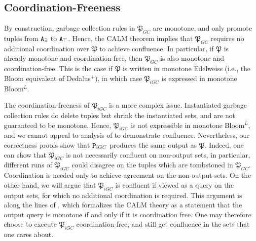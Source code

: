 \subsection{Coordination-Freeness}
By construction, garbage collection rules in $\mathfrak{P}_{GC}$ are monotone, and only promote tuples from $\tt{A}_\exists$ to $\tt{A}_\top$.
Hence, the CALM theorem implies that $\mathfrak{P}_{GC}$ requires no additional coordination over $\mathfrak{P}$ to achieve confluence.
In particular, if $\mathfrak{P}$ is already monotone and coordination-free, then $\mathfrak{P}_{GC}$ is also monotone and coordination-free.
This is the case if $\mathfrak{P}$ is written in monotone Edelweiss (i.e., the Bloom equivalent of Dedalus$^+$), in which case $\mathfrak{P}_{iGC}$ is expressed in monotone Bloom$^L$.

The coordination-freeness of $\mathfrak{P}_{iGC}$ is a more complex issue.
Instantiated garbage collection rules do delete tuples but shrink the instantiated sets, and are not guaranteed to be monotone.
Hence, $\mathfrak{P}_{iGC}$ is not expressible in monotone Bloom$^L$, and we cannot appeal to analysis of \cite{marczak2012confluence} to demonstrate confluence.
Nevertheless, our correctness proofs show that $\tt{P}_{iGC}$ produces the same output as $\mathfrak{P}$.
Indeed, one can show that $\mathfrak{P}_{iGC}$ is not necessarily confluent on non-output sets, in particular, different runs of $\mathfrak{P}_{iGC}$ could disagree on the tuples which are tombstoned in $\mathfrak{P}_{GC}$.
Coordination is needed only to achieve agreement on the non-output sets.
On the other hand, we will argue that $\mathfrak{P}_{iGC}$ is confluent if viewed as a query on the output sets, for which no additional coordination is required.
This argument is along the lines of \cite{ameloot2013relational}, which formalizes the CALM theory as a statement that the output query is monotone if and only if it is coordination free.
One may therefore choose to execute $\mathfrak{P}_{iGC}$ coordination-free, and still get confluence in the sets that one cares about.


